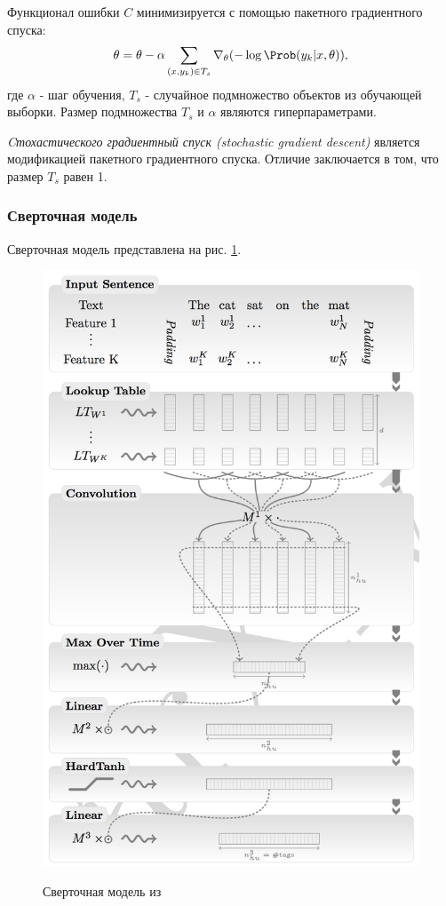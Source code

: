   Функционал ошибки $C$ минимизируется с помощью пакетного градиентного спуска:
  \[
    \theta = \theta - \alpha \sum_{(x, y_k) \in T_s} \nabla_{\theta}(-\log\Prob(y_k | x, \theta)),
  \]
  где $\alpha$ - шаг обучения, $T_s$ - случайное подмножество объектов из обучающей выборки.
  Размер подмножества $T_s$ и $\alpha$ являются гиперпараметрами.

  \textit{Cтохастического градиентный спуск (stochastic gradient descent)} является
  модификацией пакетного градиентного спуска. Отличие заключается в том, что размер $T_s$ равен 1.

  \subsubsection{Сверточная модель}
  Сверточная модель представлена на рис. \ref{figure:conv_net}.
  \newpage
  \begin{figure}[!h]
    \centering
    \caption{Сверточная модель из \citep{collobert2011natural}}
    \includegraphics[scale=0.9]{figures/sentence-diagram.png}
    \label{figure:conv_net}
  \end{figure}

